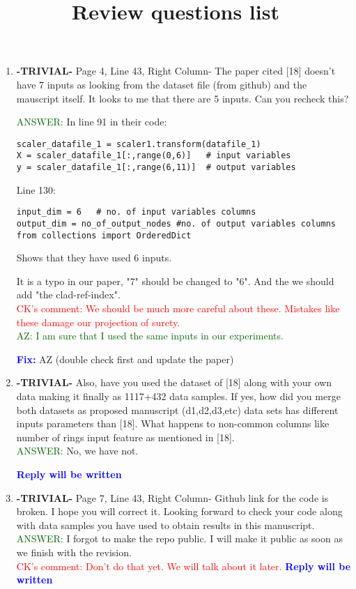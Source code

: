 \documentclass{article}
\title{Review questions list}
\newcommand{\fix}{\large \textcolor{blue}{ \textbf{Fix:} }}
\newcommand{\reply}{\large \textcolor{blue}{ \textbf{Reply will be written} }}
\begin{document}
\begin{enumerate}
	\item \textbf{-TRIVIAL-} Page 4, Line 43, Right Column- The paper cited [18] doesn't have 7 inputs as looking from the dataset file (from github) and the mauscript itself. It looks to me that there are 5 inputs. Can you recheck this?

\textcolor{darkgreen}{ANSWER: } In line 91 in their code:
\begin{verbatim}
scaler_datafile_1 = scaler1.transform(datafile_1) 
X = scaler_datafile_1[:,range(0,6)]   # input variables
y = scaler_datafile_1[:,range(6,11)]  # output variables

\end{verbatim}

Line 130:
\begin{verbatim}
input_dim = 6   # no. of input variables columns
output_dim = no_of_output_nodes #no. of output variables columns
from collections import OrderedDict
\end{verbatim}

Shows that they have used 6 inputs.

It is a typo in our paper, "7" should be changed to "6". And the we should add "the clad-ref-index".	\\
\textcolor{red}{ CK's comment: We should be much more careful about these. Mistakes like these damage our projection of surety.}\\

\textcolor{darkgreen}{ AZ: I am sure that I used the same inputs in our experiments.}

\fix AZ (double check first and update the paper)

	
	\item \textbf{-TRIVIAL-} Also, have you used the dataset of [18] along with your own data making it finally as 1117+432 data samples. If yes, how did you merge both datasets as proposed manuscript (d1,d2,d3,etc) data sets has different inputs parameters than [18]. What happens to non-common columns like number of rings input feature as mentioned in [18].     \\
	\textcolor{darkgreen}{ANSWER: } No, we have not. 
	
	\reply
		
		
\item \textbf{-TRIVIAL-} Page 7, Line 43, Right Column- Github link for the code is broken. I hope you will correct it. Looking forward to check your code along with data samples you have used  to obtain results in this manuscript. \\
\textcolor{darkgreen}{ANSWER: } I forgot to make the repo public. I will make it public as soon as we finish with the revision. \\ 
\textcolor{red}{ CK's comment: Don't do that yet. We will talk about it later.}
\reply
    

\end{enumerate}
\end{document}
